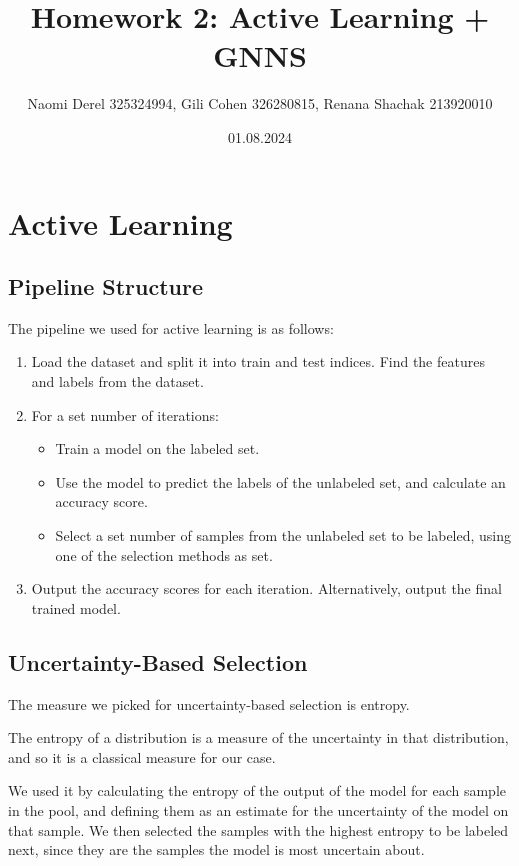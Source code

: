 \documentclass[12pt]{article}
\begin{document}
\title{Homework 2: Active Learning + GNNS}
\author{Naomi Derel 325324994, Gili Cohen 326280815, Renana Shachak 213920010}
\date{01.08.2024}
\maketitle

\section{Active Learning}

\subsection{Pipeline Structure}

The pipeline we used for active learning is as follows:
\begin{enumerate}
    \item Load the dataset and split it into train and test indices. Find the features and labels from the dataset.
    \item For a set number of iterations:
    \begin{itemize}
        \item Train a model on the labeled set.
        \item Use the model to predict the labels of the unlabeled set, and calculate an accuracy score.
        \item Select a set number of samples from the unlabeled set to be labeled, using one of the selection methods as set.
    \end{itemize}
    \item Output the accuracy scores for each iteration. Alternatively, output the final trained model.
\end{enumerate}

\subsection{Uncertainty-Based Selection}

The measure we picked for uncertainty-based selection is entropy. 

The entropy of a distribution is a measure of the uncertainty in that distribution, and so it is a classical measure for our case. 

We used it by calculating the entropy of the output of the model for each sample in the pool, and defining them as an estimate for the uncertainty of the model on that sample. We then selected the samples with the highest entropy to be labeled next, since they are the samples the model is most uncertain about.
\end{document}
